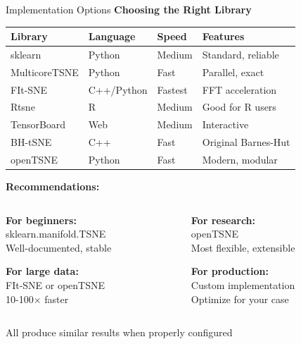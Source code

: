 \documentclass[10pt]{beamer}
\newcommand{\emphtext}[1]{\textcolor{upcblue}{\textbf{#1}}}
\newcommand{\conceptbox}[1]{\colorbox{upcblue!10}{\begin{minipage}{0.85\textwidth}\centering #1\end{minipage}}}
\begin{document}
\begin{frame}{Implementation Options}
\emphtext{Choosing the Right Library}

\vspace{0.3cm}
\begin{center}
\small
\begin{tabular}{llll}
\toprule
\textbf{Library} & \textbf{Language} & \textbf{Speed} & \textbf{Features} \\
\midrule
sklearn & Python & Medium & Standard, reliable \\
MulticoreTSNE & Python & Fast & Parallel, exact \\
FIt-SNE & C++/Python & Fastest & FFT acceleration \\
Rtsne & R & Medium & Good for R users \\
TensorBoard & Web & Medium & Interactive \\
BH-tSNE & C++ & Fast & Original Barnes-Hut \\
openTSNE & Python & Fast & Modern, modular \\
\bottomrule
\end{tabular}
\end{center}

\vspace{0.3cm}
\textbf{Recommendations:}

\begin{columns}[T]
\begin{column}{0.48\textwidth}
\footnotesize
\textbf{For beginners:}\\
sklearn.manifold.TSNE\\
Well-documented, stable

\textbf{For large data:}\\
FIt-SNE or openTSNE\\
10-100× faster
\end{column}

\begin{column}{0.48\textwidth}
\footnotesize
\textbf{For research:}\\
openTSNE\\
Most flexible, extensible

\textbf{For production:}\\
Custom implementation\\
Optimize for your case
\end{column}
\end{columns}

\begin{center}
\conceptbox{\footnotesize All produce similar results when properly configured}
\end{center}
\end{frame}
\end{document}
